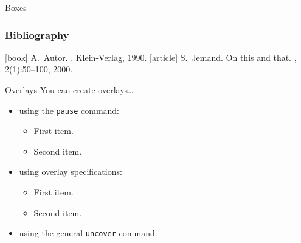 \documentclass[xcolor={dvipsnames},10pt]{beamer}
\begin{document}
\begin{frame}{Boxes}
\end{frame}

\begin{frame}[allowframebreaks]
    \frametitle<presentation>{Bibliography}
    \begin{thebibliography}{10}
        [book]
        A.~Autor.
        .
        \newblock Klein-Verlag, 1990.
        [article]
        S.~Jemand.
        \newblock On this and that.
        , 2(1):50--100, 2000.
    \end{thebibliography}
\end{frame}

\begin{frame}{Overlays}
    You can create overlays\dots
    \begin{itemize}
        \item using the \texttt{pause} command:
            \begin{itemize}
                \item
                    First item.
                    \pause
                \item
                    Second item.
            \end{itemize}
        \item
            using overlay specifications:
            \begin{itemize}
                \item<3->
                    First item.
                \item<4->
                    Second item.
            \end{itemize}
        \item
            using the general \texttt{uncover} command:
            \begin{itemize}
        \end{itemize}
    \end{itemize}
\end{frame}
\end{document}
